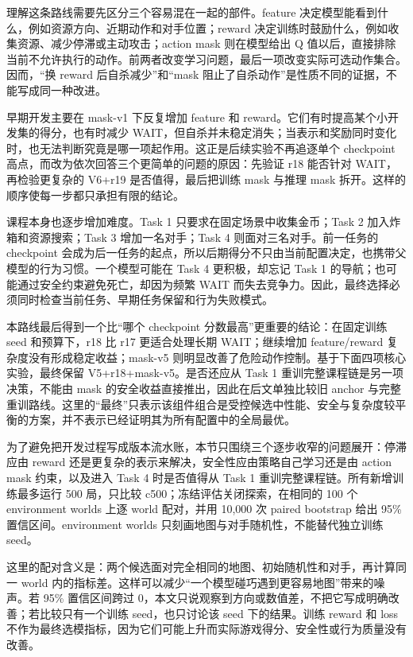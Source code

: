 \documentclass[UTF8,11pt,a4paper,fontset=none]{ctexart}
\begin{document}
理解这条路线需要先区分三个容易混在一起的部件。feature 决定模型能看到什么，例如资源方向、近期动作和对手位置；reward 决定训练时鼓励什么，例如收集资源、减少停滞或主动攻击；action mask 则在模型给出 Q 值以后，直接排除当前不允许执行的动作。前两者改变学习问题，最后一项改变实际可选动作集合。因而，“换 reward 后自杀减少”和“mask 阻止了自杀动作”是性质不同的证据，不能写成同一种改进。

早期开发主要在 mask-v1 下反复增加 feature 和 reward。它们有时提高某个小开发集的得分，也有时减少 WAIT，但自杀并未稳定消失；当表示和奖励同时变化时，也无法判断究竟是哪一项起作用。这正是后续实验不再追逐单个 checkpoint 高点，而改为依次回答三个更简单的问题的原因：先验证 r18 能否针对 WAIT，再检验更复杂的 V6+r19 是否值得，最后把训练 mask 与推理 mask 拆开。这样的顺序使每一步都只承担有限的结论。

课程本身也逐步增加难度。Task 1 只要求在固定场景中收集金币；Task 2 加入炸箱和资源搜索；Task 3 增加一名对手；Task 4 则面对三名对手。前一任务的 checkpoint 会成为后一任务的起点，所以后期得分不只由当前配置决定，也携带父模型的行为习惯。一个模型可能在 Task 4 更积极，却忘记 Task 1 的导航；也可能通过安全约束避免死亡，却因为频繁 WAIT 而失去竞争力。因此，最终选择必须同时检查当前任务、早期任务保留和行为失败模式。

本路线最后得到一个比“哪个 checkpoint 分数最高”更重要的结论：在固定训练 seed 和预算下，r18 比 r17 更适合处理长期 WAIT；继续增加 feature/reward 复杂度没有形成稳定收益；mask-v5 则明显改善了危险动作控制。基于下面四项核心实验，最终保留 V5+r18+mask-v5。是否还应从 Task 1 重训完整课程链是另一项决策，不能由 mask 的安全收益直接推出，因此在后文单独比较旧 anchor 与完整重训路线。这里的“最终”只表示该组件组合是受控候选中性能、安全与复杂度较平衡的方案，并不表示已经证明其为所有配置中的全局最优。

为了避免把开发过程写成版本流水账，本节只围绕三个逐步收窄的问题展开：停滞应由 reward 还是更复杂的表示来解决，安全性应由策略自己学习还是由 action mask 约束，以及进入 Task 4 时是否值得从 Task 1 重训完整课程链。所有新增训练最多运行 500 局，只比较 c500；冻结评估关闭探索，在相同的 100 个 environment worlds 上逐 world 配对，并用 10,000 次 paired bootstrap 给出 95\% 置信区间。environment worlds 只刻画地图与对手随机性，不能替代独立训练 seed。

这里的配对含义是：两个候选面对完全相同的地图、初始随机性和对手，再计算同一 world 内的指标差。这样可以减少“一个模型碰巧遇到更容易地图”带来的噪声。若 95\% 置信区间跨过 0，本文只说观察到方向或数值差，不把它写成明确改善；若比较只有一个训练 seed，也只讨论该 seed 下的结果。训练 reward 和 loss 不作为最终选模指标，因为它们可能上升而实际游戏得分、安全性或行为质量没有改善。
\end{document}
